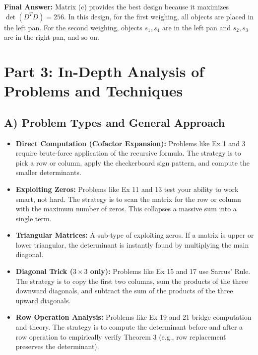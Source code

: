 \documentclass{article}
\begin{document}
\textbf{Final Answer:} Matrix (c) provides the best design because it maximizes $\det(D^T D) = 256$. In this design, for the first weighing, all objects are placed in the left pan. For the second weighing, objects $s_1, s_4$ are in the left pan and $s_2, s_3$ are in the right pan, and so on.

\newpage
\section{Part 3: In-Depth Analysis of Problems and Techniques}

\subsection{A) Problem Types and General Approach}
\begin{itemize}
    \item \textbf{Direct Computation (Cofactor Expansion):} Problems like Ex 1 and 3 require brute-force application of the recursive formula. The strategy is to pick a row or column, apply the checkerboard sign pattern, and compute the smaller determinants.
    \item \textbf{Exploiting Zeros:} Problems like Ex 11 and 13 test your ability to work smart, not hard. The strategy is to scan the matrix for the row or column with the maximum number of zeros. This collapses a massive sum into a single term.
    \item \textbf{Triangular Matrices:} A sub-type of exploiting zeros. If a matrix is upper or lower triangular, the determinant is instantly found by multiplying the main diagonal.
    \item \textbf{Diagonal Trick ($3 \times 3$ only):} Problems like Ex 15 and 17 use Sarrus' Rule. The strategy is to copy the first two columns, sum the products of the three downward diagonals, and subtract the sum of the products of the three upward diagonals.
    \item \textbf{Row Operation Analysis:} Problems like Ex 19 and 21 bridge computation and theory. The strategy is to compute the determinant before and after a row operation to empirically verify Theorem 3 (e.g., row replacement preserves the determinant).
\end{itemize}
\end{document}
